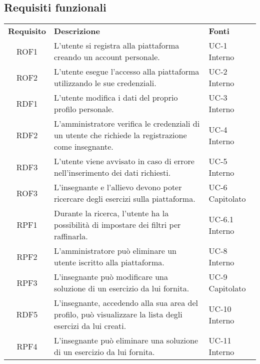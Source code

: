 \subsection{Requisiti funzionali}
\begin{tabularx}{\textwidth}{| c | p{10cm} | X |}
		\rowcolor{LightBlue}
		\color{white}\bfseries Requisito & \color{white}\bfseries Descrizione & \color{white}\bfseries Fonti\\[0.25cm]
		ROF1 & L'utente si registra alla piattaforma creando un account personale. & UC-1 \newline Interno\\
		ROF2 & L'utente esegue l'accesso alla piattaforma utilizzando le sue credenziali. & UC-2 \newline Interno\\
		RDF1 & L'utente modifica i dati del proprio profilo personale. & UC-3 \newline Interno\\
		RDF2 & L'amministratore verifica le credenziali di un utente che richiede la registrazione come insegnante. & UC-4 \newline Interno\\
		RDF3 & L'utente viene avvisato in caso di errore nell'inserimento dei dati richiesti. & UC-5 \newline Interno\\
		ROF3 & L'insegnante e l'allievo devono poter ricercare degli esercizi sulla piattaforma. & UC-6 \newline Capitolato\\
		RPF1 & Durante la ricerca, l'utente ha la possibilità di impostare dei filtri per raffinarla. & UC-6.1 \newline Interno\\
		RPF2 & L'amministratore può eliminare un utente iscritto alla piattaforma. & UC-8 \newline Interno\\
		RPF3 & L'insegnante può modificare una soluzione di un esercizio da lui fornita. & UC-9 \newline Capitolato\\
		RDF5 & L'insegnante, accedendo alla sua area del profilo, può visualizzare la lista degli esercizi da lui creati. & UC-10 \newline Interno\\
		RPF4 & L'insegnante può eliminare una soluzione di un esercizio da lui fornita. & UC-11 \newline Interno\\

\end{tabularx}
